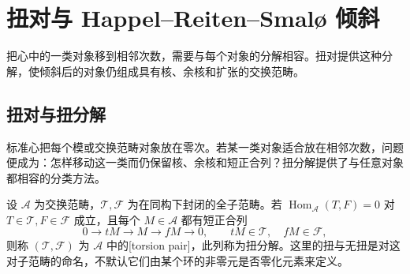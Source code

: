 
\section{扭对与 Happel–Reiten–Smalø 倾斜}
\label{b4:sec:1904}

把心中的一类对象移到相邻次数，需要与每个对象的分解相容。扭对提供这种分解，使倾斜后的对象仍组成具有核、余核和扩张的交换范畴。


%
%

\subsection{扭对与扭分解}
\label{b4:subsec:1904:01}

标准心把每个模或交换范畴对象放在零次。若某一类对象适合放在相邻次数，问题便成为：怎样移动这一类而仍保留核、余核和短正合列？扭分解提供了与任意对象都相容的分类方法。

\begin{definition}\label{b4:def:torsion-pair}
	设 \(\mathcal A\) 为交换范畴，\(\mathcal T,\mathcal F\) 为在同构下封闭的全子范畴。若 \(\operatorname{Hom}_{\mathcal A}(T,F)=0\) 对 \(T\in\mathcal T,F\in\mathcal F\) 成立，且每个 \(M\in\mathcal A\) 都有短正合列
	\[
		0\longrightarrow tM\longrightarrow M\longrightarrow fM\longrightarrow0, \qquad tM\in\mathcal T,\quad fM\in\mathcal F,
	\]
	则称 \((\mathcal T,\mathcal F)\) 为 \(\mathcal A\) 中的[torsion pair]，此列称为扭分解。这里的扭与无扭是对这对子范畴的命名，不默认它们由某个环的非零元是否零化元素来定义。
\end{definition}

